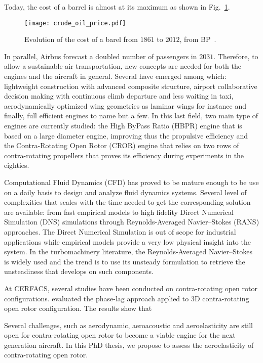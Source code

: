 Today, the cost of a barrel is almost at its maximum as shown
in Fig.~\ref{fig:crude_oil_price}.
\begin{figure}[htp]
  \centering
  \texttt{[image: crude\_oil\_price.pdf]}
  \caption{Evolution of the cost of a barel from $1861$ to $2012$, from BP~\cite{bpreview2013}.}
  \label{fig:crude_oil_price}
\end{figure}
In parallel, Airbus forecast a doubled number of passengers in
$2031$. Therefore, to allow a sustainable air transportation, new
concepts are needed for both the engines and the 
aircraft in general.
Several have emerged among which: lightweight construction
with advanced composite structure, airport collaborative decision
making with continuous climb departure and less waiting in taxi,
aerodynamically optimized wing geometries as laminar wings for instance
and finally, full efficient engines to name but a few.
In this last field, two main type of engines are currently studied: the
High ByPass Ratio (HBPR) engine that is based on a
large diameter engine, improving thus the
propulsive efficiency and the Contra-Rotating Open Rotor (CROR)
engine that relies on two rows of contra-rotating propellers
that proves its efficiency during experiments in the
eighties.


Computational Fluid Dynamics (CFD) has proved to be
mature enough to be use on a daily basis to design
and analyze fluid dynamics systems. Several level
of complexities that scales with the time needed
to get the corresponding solution are available: from fast
empirical models to high fidelity Direct Numerical Simulation (DNS)
simulations through Reynolds-Averaged Navier--Stokes (RANS)
approaches. The Direct Numerical Simulation is out of scope for
industrial applications while empirical models provide
a very low physical insight into the system.
In the turbomachinery literature, the Reynolds-Averaged Navier--Stokes
is widely used and the trend is to use its unsteady formulation
to retrieve the unsteadiness that develops on such components.




At CERFACS, several studies have been conducted on 
contra-rotating open rotor
configurations. \citet{Burnazzi2010} evaluated the phase-lag approach
applied to 3D contra-rotating open rotor configuration. The results show that

 



Several challenges, such as aerodynamic,
aeroacoustic and aeroelasticity are still open for contra-rotating open rotor
to become a viable engine for the next generation aircraft.
In this PhD thesis, we propose to assess the aeroelasticity of 
contra-rotating open rotor. 





